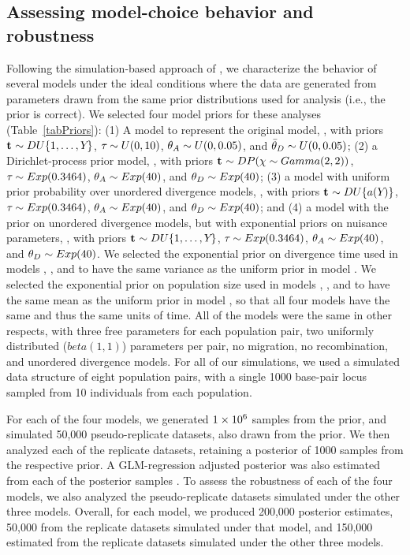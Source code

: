 \documentclass[letterpaper,12pt]{article}
\begin{document}
\begin{linenumbers}
\subsection*{Assessing model-choice behavior and robustness}
Following the simulation-based approach of \citet{Oaks2012}, we characterize
the behavior of several models under the ideal conditions where the
data are generated from parameters drawn from the same prior distributions used
for analysis (i.e., the prior is correct).
We selected four model priors for these analyses (Table~\ref{tabPriors}):
(1) A model to represent the original \msb model, \modelOld, with
priors
$\mathbf{t_{}} \sim DU\{1, \ldots, Y_{}\}$,
$\tau_{} \sim U(0,10)$,
$\ancestralTheta{} \sim U(0, 0.05)$,
and
$\descendantThetaMean{} \sim U(0, 0.05)$;
(2) a Dirichlet-process prior model, \modelDPP, with priors
$\mathbf{t_{}} \sim DP(\chi \sim Gamma(2,2))$,
$\tau_{} \sim Exp(0.3464)$,
$\ancestralTheta{} \sim Exp(40)$,
and
$\descendantTheta{}{} \sim Exp(40)$;
(3) a model with uniform prior probability over unordered divergence models,
\modelUniform, with priors
$\mathbf{t_{}} \sim DU\{a({Y_{}})\}$,
$\tau_{} \sim Exp(0.3464)$,
$\ancestralTheta{} \sim Exp(40)$,
and
$\descendantTheta{}{} \sim Exp(40)$;
and
(4) a model with the \msb prior on unordered divergence models, but with
exponential priors on nuisance parameters,
\modelUshaped, with priors
$\mathbf{t_{}} \sim DU\{1, \ldots, Y_{}\}$,
$\tau_{} \sim Exp(0.3464)$,
$\ancestralTheta{} \sim Exp(40)$,
and
$\descendantTheta{}{} \sim Exp(40)$.
We selected the exponential prior on divergence time used in models \modelDPP,
\modelUniform, and \modelUshaped to have the same variance as the uniform prior
in model \modelOld.
We selected the exponential prior on population size used in models \modelDPP,
\modelUniform, and \modelUniform to have the same mean as the uniform prior in
model \modelOld, so that all four models have the same  and thus the
same units of time.
All of the models were the same in other respects, with three free \myTheta{}
parameters for each population pair, two uniformly distributed ($beta(1,1)$)
\bottleScalar{}{} parameters per pair, no migration, no recombination,
and unordered divergence models.
For all of our simulations, we used a simulated data structure of eight
population pairs, with a single 1000 base-pair locus sampled from 10
individuals from each population.

For each of the four models, we generated $1\times 10^{6}$ samples from the prior, and
simulated 50,000 pseudo-replicate datasets, also drawn from the prior.
We then analyzed each of the replicate datasets, retaining a
posterior of 1000 samples from the respective prior.
A GLM-regression adjusted posterior was also estimated from each of the
posterior samples \citep{Leuenberger2010}.
To assess the robustness of each of the four models, we also analyzed the
pseudo-replicate datasets simulated under the other three models.
Overall, for each model, we produced 200,000 posterior estimates,
50,000 from the replicate datasets simulated under that model,
and 150,000 estimated from the replicate datasets simulated under the
other three models.


\end{linenumbers}
\end{document}
